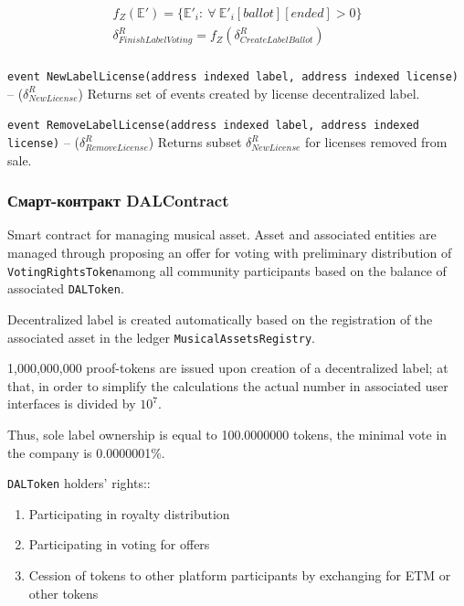 \documentclass[12pt]{report}
\def\code#1{\colorbox{light-gray}{\texttt{#1}}}
\begin{document}
\begin{equation}
\begin{aligned}
f_Z(\mathbb{E}') = \{\mathbb{E}'_i : \ \forall \ \mathbb{E}'_i[ballot][ended] > 0 \} \\
\delta^R_{FinishLabelVoting} = f_Z(\delta^R_{CreateLabelBallot}) \\
\end{aligned}
\end{equation}

\code{event NewLabelLicense(address indexed label, address indexed license)} – ($\delta^R_{NewLicense}$)\hfill\null\linebreak
Returns set of events created by license decentralized label.

\code{event RemoveLabelLicense(address indexed label, address indexed license)} – ($\delta^R_{RemoveLicense}$)\hfill\null\linebreak
Returns subset $\delta^R_{NewLicense}$ for licenses removed from sale.

\subsubsection{Смарт-контракт DALContract}
\label{tech-apps-dal-label}
\begin{multicols}{2}
Smart contract for managing musical asset. Asset and associated entities are managed through proposing an offer for voting with preliminary distribution of \code{VotingRightsToken}among all community participants based on the balance of associated \code{DALToken}.
 
Decentralized label is created automatically based on the registration of the associated asset in the ledger \code{MusicalAssetsRegistry}.

1,000,000,000 proof-tokens are issued upon creation of a decentralized label; at that, in order to simplify the calculations the actual number in associated user interfaces is divided by $10^7$. 

Thus, sole label ownership is equal to 100.0000000 tokens, the minimal vote in the company is 0.0000001\%.

\code{DALToken} holders' rights::
\begin{enumerate}
	\item Participating in royalty distribution
	\item Participating in voting for offers
	\item Cession of tokens to other platform participants by exchanging for ETM or other tokens
\end{enumerate}
\end{multicols}
\end{document}
